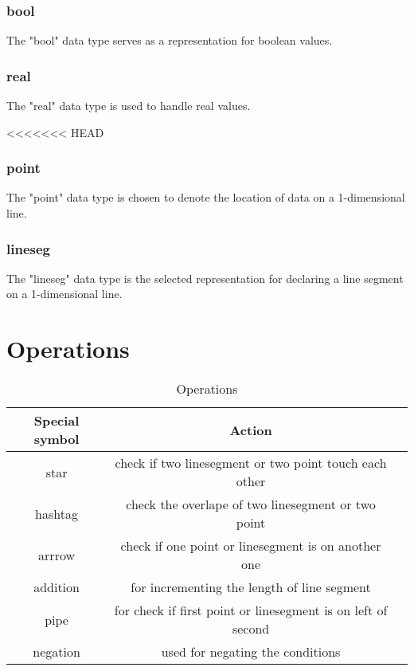 \documentclass{article}
\begin{document}
\subsubsection{bool}
\begin{description}[leftmargin=1cm]
  \item[Usage:] The "bool" data type serves as a representation for boolean values.
\end{description}

\subsubsection{real}
\begin{description}[leftmargin=1cm]
  \item[Usage:] The "real" data type is used to handle real values.
\end{description}
<<<<<<< HEAD

\subsubsection{point}
\begin{description}[leftmargin=1cm]
  \item[Usage:] The "point" data type is chosen to denote the location of data on a 1-dimensional line.
\end{description}

\subsubsection{lineseg}
\begin{description}[leftmargin=1cm]
  \item[Usage:] The "lineseg" data type is the selected representation for declaring a line segment on a 1-dimensional line.
\end{description}

\section{Operations}
\begin{table}[h!]
  \centering
  \caption{Operations}
  \label{tab:Operations}
  \begin{tabular}{|c|c|c|}
  \hline
  Special symbol & Action  \\
  \hline
  star &  check if  two linesegment or two point touch each other \\
  hashtag & check the overlape of two linesegment or two point  \\
  arrrow &  check if one point or linesegment is on another one\\
  addition & for incrementing the length of line segment \\
  pipe & for check if first point or linesegment is on left of second \\
  negation & used for negating the conditions\\
  \hline
  \end{tabular}
  \end{table}
\end{document}
